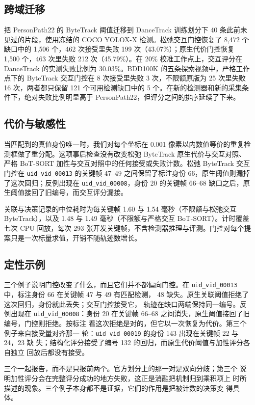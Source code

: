\subsection{跨域迁移}
把 PersonPath22 的 ByteTrack 阈值迁移到 DanceTrack 训练划分下 40 条此前未见过的片段，使用冻结的 COCO YOLOX-X 检测。松弛交互门控恢复了 8,472 个缺口中的 1,506 个，462 次接受里失败 199 次（43.07\%）；原生代价门控恢复 1,500 个，463 次里失败 212 次（45.79\%）。在 20\% 校准工作点上，交互评分在 DanceTrack 的实测失败比例为 30.03\%。BDD100K 的五条探索视频中，严格工作点下的 ByteTrack 交互门控在 8 次接受里失败 3 次，不限额原版为 25 次里失败 16 次，两者都只保留 121 个可用检测缺口中的 5 个。在新的检测器和新的采集条件下，绝对失败比例明显高于 PersonPath22，但评分之间的排序延续了下来。

\subsection{代价与敏感性}
当匹配到的真值身份唯一时，我们对每个坐标在 0.001 像素以内数值等价的重复检测框做了重分配。这项事后检查没有改变松弛 ByteTrack 原生代价与交互对照、严格 BoT-SORT 加性与交互对照中的任何接受或失败计数。松弛 ByteTrack 交互门控在 \texttt{uid\_vid\_00013} 的关键帧 47--49 之间保留了标注身份 66，原生阈值则漏掉了这次回归；反例出现在 \texttt{uid\_vid\_00008}，身份 20 的关键帧 66--68 缺口之后，原生阈值接回了旧编号，而交互评分漏接。

关联与决策记录的中位耗时为每关键帧 1.60 与 1.54 毫秒（不限额与松弛交互 ByteTrack），以及 1.48 与 1.49 毫秒（不限额与严格交互 BoT-SORT）。计时覆盖七次 CPU 回放，每次 293 张开发关键帧，不含检测器推理与评测。门控对每个提案只是一次标量求值，开销不随轨迹数增长。

\subsection{定性示例}

三个例子说明门控改变了什么，而且它们并不都偏向门控。在
\texttt{uid\_vid\_00013} 中，标注身份 66 在关键帧 47 与 49 有匹配检测，
48 缺失。原生关联阈值拒绝了这次回归，身份就此丢失；交互门控接受它，
轨迹在缺口两端保持同一编号。反例出现在 \texttt{uid\_vid\_00008}：身份
20 在关键帧 66--68 之间消失，原生阈值接回了旧编号，门控则拒绝。按标注
看这次拒绝是对的，但它以一次恢复为代价。第三个例子来自接受量对齐那一
轮：\texttt{uid\_vid\_00019} 的身份 143 出现在关键帧 22 与 24，23 缺
失；结构化评分接受了编号 132 的回归，而原生代价阈值与加性评分各自独立
回放后都没有接受。

三个一起报告，而不是只报前两个。官方划分上的那一对是双向分歧；第三个
说明加性评分会在完整评分成功的地方失败，这正是消融把机制归到乘积项上
时所描述的现象。三个例子本身都不是证据，它们的作用是把被计数的决策变
得具体。

